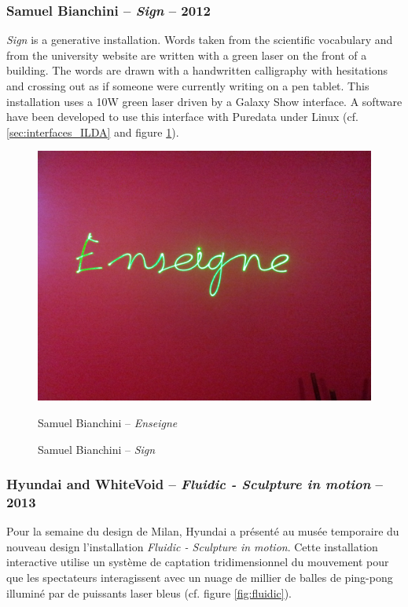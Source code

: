 \begin{en}
\subsubsection{Samuel Bianchini -- \textit{Sign} -- 2012}
\textit{Sign} is a generative installation. Words taken from the scientific vocabulary and from the university website are written with a green laser on the front of a building.
The words are drawn with a handwritten calligraphy with hesitations and crossing out as if someone were currently writing on a pen tablet.
This installation uses a 10\unit{W} green laser driven by a Galaxy Show interface.
A software have been developed to use this interface with Puredata under Linux (cf. \ref{sec:interfaces_ILDA} and figure \ref{fig:bianchini}).
\end{en}
\begin{figure}[ht]
\begin{center}
\includegraphics[width=\textwidth]{images/enseigne.jpg} 
\end{center}
\begin{fr}
\caption{Samuel Bianchini -- \textit{Enseigne}}
\end{fr}
\begin{en}
\caption{Samuel Bianchini -- \textit{Sign}}
\end{en}
\label{fig:bianchini}
\end{figure}

\subsubsection{Hyundai and WhiteVoid -- \textit{Fluidic - Sculpture in motion} -- 2013}
\begin{fr}
Pour la semaine du design de Milan, Hyundai a présenté au musée temporaire du nouveau design l'installation \textit{Fluidic - Sculpture in motion}.
Cette installation interactive utilise un système de captation tridimensionnel du mouvement pour que les spectateurs interagissent avec un nuage de millier de balles de ping-pong illuminé par de puissants laser bleus (cf. figure \ref{fig:fluidic}).
\end{fr}

